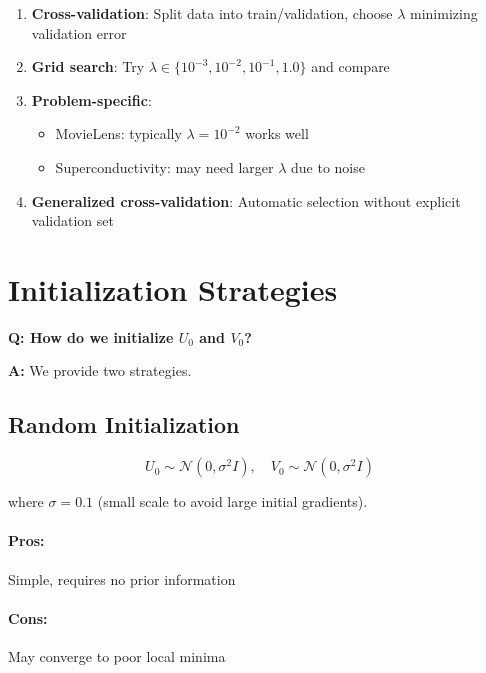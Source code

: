 \documentclass[11pt,oneside]{article}
\newcommand{\question}[1]{\textbf{Q: #1}}
\newcommand{\answer}{\textbf{A: }}
\begin{document}
\begin{enumerate}
    \item \textbf{Cross-validation}: Split data into train/validation, choose $\lambda$ minimizing validation error
    \item \textbf{Grid search}: Try $\lambda \in \{10^{-3}, 10^{-2}, 10^{-1}, 1.0\}$ and compare
    \item \textbf{Problem-specific}: 
    \begin{itemize}
        \item MovieLens: typically $\lambda = 10^{-2}$ works well
        \item Superconductivity: may need larger $\lambda$ due to noise
    \end{itemize}
    \item \textbf{Generalized cross-validation}: Automatic selection without explicit validation set
\end{enumerate}

\section{Initialization Strategies}\label{sec:initialization}

\question{How do we initialize $U_0$ and $V_0$?}

\answer We provide two strategies.

\subsection*{Random Initialization}

\begin{equation}
    U_0 \sim \mathcal{N}(0, \sigma^2 I), \quad V_0 \sim \mathcal{N}(0, \sigma^2 I)
\end{equation}

where $\sigma = 0.1$ (small scale to avoid large initial gradients).

\paragraph{Pros:} Simple, requires no prior information

\paragraph{Cons:} May converge to poor local minima
\end{document}

